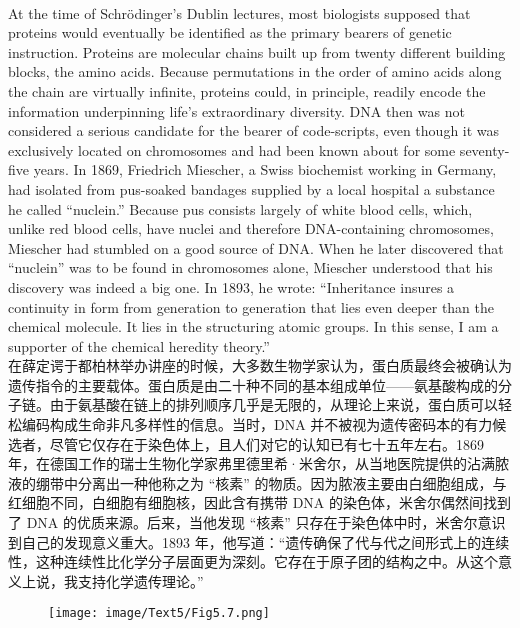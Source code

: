 \documentclass{article}
\begin{document}
\\
At the time of Schrödinger’s Dublin lectures, most biologists supposed that proteins would eventually be identified as the primary bearers of genetic instruction. Proteins are molecular chains built up from twenty different building blocks, the amino acids. Because permutations in the order of amino acids along the chain are virtually infinite, proteins could, in principle, readily encode the information underpinning life’s extraordinary diversity. DNA then was not considered a serious candidate for the bearer of code-scripts, even though it was exclusively located on chromosomes and had been known about for some seventy-five years. In 1869, Friedrich Miescher, a Swiss biochemist working in Germany, had isolated from pus-soaked bandages supplied by a local hospital a substance he called “nuclein.” Because pus consists largely of white blood cells, which, unlike red blood cells, have nuclei and therefore DNA-containing chromosomes, Miescher had stumbled on a good source of DNA. When he later discovered that “nuclein” was to be found in chromosomes alone, Miescher understood that his discovery was indeed a big one. In 1893, he wrote: “Inheritance insures a continuity in form from generation to generation that lies even deeper than the chemical molecule. It lies in the structuring atomic groups. In this sense, I am a supporter of the chemical heredity theory.”\\
在薛定谔于都柏林举办讲座的时候，大多数生物学家认为，蛋白质最终会被确认为遗传指令的主要载体。蛋白质是由二十种不同的基本组成单位——氨基酸构成的分子链。由于氨基酸在链上的排列顺序几乎是无限的，从理论上来说，蛋白质可以轻松编码构成生命非凡多样性的信息。当时，DNA 并不被视为遗传密码本的有力候选者，尽管它仅存在于染色体上，且人们对它的认知已有七十五年左右。1869 年，在德国工作的瑞士生物化学家弗里德里希·米舍尔，从当地医院提供的沾满脓液的绷带中分离出一种他称之为 “核素” 的物质。因为脓液主要由白细胞组成，与红细胞不同，白细胞有细胞核，因此含有携带 DNA 的染色体，米舍尔偶然间找到了 DNA 的优质来源。后来，当他发现 “核素” 只存在于染色体中时，米舍尔意识到自己的发现意义重大。1893 年，他写道：“遗传确保了代与代之间形式上的连续性，这种连续性比化学分子层面更为深刻。它存在于原子团的结构之中。从这个意义上说，我支持化学遗传理论。” \\

\begin{figure}
    \centering
    \texttt{[image: image/Text5/Fig5.7.png]}
\end{figure}
\end{document}
